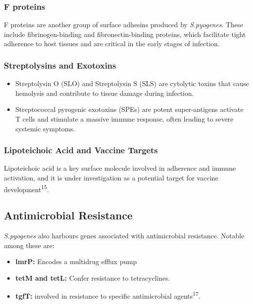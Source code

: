 \documentclass[
]{article}
\providecommand{\tightlist}{%
  \setlength{\itemsep}{0pt}\setlength{\parskip}{0pt}}
\begin{document}
\subsubsection{F proteins}\label{f-proteins}

F proteins are another group of surface adhesins produced by
\emph{S.pyogenes}. These include fibrinogen-binding and
fibronectin-binding proteins, which facilitate tight adherence to host
tissues and are critical in the early stages of infection.

\subsubsection{Streptolysins and
Exotoxins}\label{streptolysins-and-exotoxins}

\begin{itemize}
\item
  Streptolysin O (SLO) and Streptolysin S (SLS) are cytolytic toxins
  that cause hemolysis and contribute to tissue damage during infection.
\item
  Streptococcal pyrogenic exotoxins (SPEs) are potent super-antigens
  activate T cells and stimulate a massive immune response, often
  leading to severe systemic symptoms.
\end{itemize}

\subsubsection{Lipoteichoic Acid and Vaccine
Targets}\label{lipoteichoic-acid-and-vaccine-targets}

Lipoteichoic acid is a key surface molecule involved in adherence and
immune activation, and it is under investigation as a potential target
for vaccine development\textsuperscript{15}.

\subsection{Antimicrobial Resistance}\label{antimicrobial-resistance}

\emph{S.pyogenes} also harbours genes associated with antimicrobial
resistance. Notable among these are:

\begin{itemize}
\tightlist
\item
  \textbf{lmrP:} Encodes a multidrug efflux pump
\item
  \textbf{tetM and tetL:} Confer resistance to tetracyclines.
\item
  \textbf{tgfT:} involved in resistance to specific antimicrobial
  agents\textsuperscript{17}.
\end{itemize}
\end{document}
